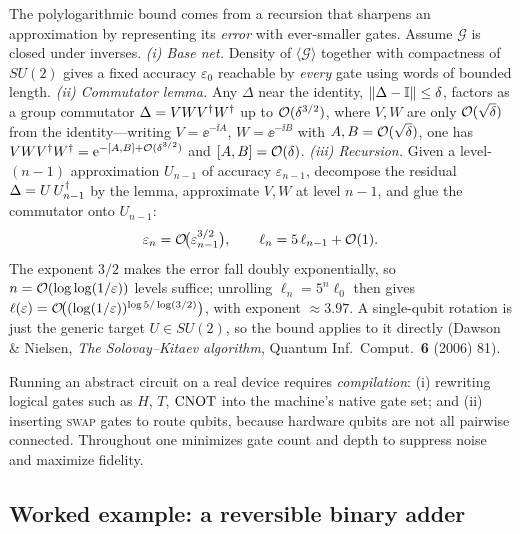 \begin{remark}\label{rem:lec01-sk-sketch}
The polylogarithmic bound comes from a recursion that sharpens an approximation by
representing its \emph{error} with ever-smaller gates. Assume $\mathcal{G}$ is closed
under inverses.
\emph{(i) Base net.} Density of $\langle\mathcal{G}\rangle$ together with compactness of
$SU(2)$ gives a fixed accuracy $\varepsilon_0$ reachable by \emph{every} gate using
words of bounded length.
\emph{(ii) Commutator lemma.} Any $\Delta$ near the identity, $\left\lVert \Delta-\mathbb{I} \right\rVert\le\delta$,
factors as a group commutator $\Delta=VWV^{\dagger} W^{\dagger}$ up to $\mathcal{O}(\delta^{3/2})$, where
$V,W$ are only $\mathcal{O}(\sqrt{\delta})$ from the identity---writing
$V=\ee^{-\ii A}$, $W=\ee^{-\ii B}$ with $A,B=\mathcal{O}(\sqrt{\delta})$, one has
$VWV^{\dagger} W^{\dagger}=\mathrm{e}^{-[A,B]+\mathcal{O}(\delta^{3/2})}$ and $[A,B]=\mathcal{O}(\delta)$.
\emph{(iii) Recursion.} Given a level-$(n{-}1)$ approximation $U_{n-1}$ of accuracy
$\varepsilon_{n-1}$, decompose the residual $\Delta=U\,U_{n-1}^{\dagger}$ by the lemma,
approximate $V,W$ at level $n{-}1$, and glue the commutator onto $U_{n-1}$:
\[
  \varepsilon_n=\mathcal{O}\!\big(\varepsilon_{n-1}^{3/2}\big),\qquad
  \ell_n=5\,\ell_{n-1}+\mathcal{O}(1).
\]
The exponent $3/2$ makes the error fall doubly exponentially, so
$n=\mathcal{O}(\log\log(1/\varepsilon))$ levels suffice; unrolling $\ell_n=5^{n}\ell_0$ then
gives $\ell(\varepsilon)=\mathcal{O}\!\big((\log(1/\varepsilon))^{\log 5/\log(3/2)}\big)$,
with exponent $\approx 3.97$. A single-qubit rotation is just the generic target
$U\in SU(2)$, so the bound applies to it directly (Dawson \& Nielsen,
\emph{The Solovay--Kitaev algorithm}, Quantum Inf.\ Comput.\ \textbf{6} (2006) 81).
\end{remark}

Running an abstract circuit on a real device requires \emph{compilation}:
(i) rewriting logical gates such as $H$, $T$, $\mathrm{CNOT}$ into the machine's native gate
set; and (ii) inserting \textsc{swap} gates to route qubits, because hardware qubits
are not all pairwise connected. Throughout one minimizes gate count and depth to
suppress noise and maximize fidelity.

\subsection{Worked example: a reversible binary adder}
\label{sec:lec01-adder}

